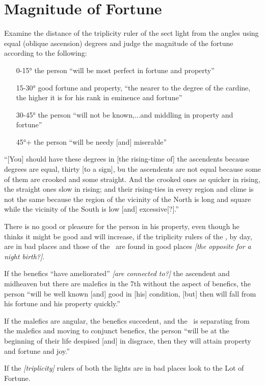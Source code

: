 \section{Magnitude of Fortune}

Examine the distance of the triplicity ruler of the sect light from the angles using equal (oblique ascension) degrees and judge the magnitude of the fortune according to the following:
\begin{itemize}[topsep=0em,itemsep=0em]
\item[0-15°] the person ``will be most perfect in fortune and property''
\item[15-30°] good fortune and property, ``the nearer to the degree of the cardine, the higher it is for his rank in eminence and fortune''
\item[30-45°] the person ``will not be known,...and middling in property and fortune''
\item[45°+]  the person ``will be needy [and] miserable''
\end{itemize}

``[You] should have these degrees in [the rising-time of] the ascendents because degrees are equal, thirty [to a sign], bu the ascendents are not equal because some of them are crooked and some straight. And the crooked ones ae quicker in rising, the straight ones slow in rising; and their rising-ties in every region and clime is not the same because the region of the vicinity of the North is long and square while the vicinity of the South is low [and] excessive[?].''

There is no good or pleasure for the person in his property, even though he thinks it might be good and will increase, if the triplicity rulers of the \Sun, by day, are in bad places and those of the \Moon\, are found in good places \textsl{[the opposite for a night birth?]}.

If the benefics ``have ameliorated'' \textsl{[are connected to?]} the ascendent and midheaven but there are malefics in the 7th without the aspect of benefics, the person ``will be well known [and] good in [his] condition, [but] then will fall from his fortune and his property quickly.''

If the malefics are angular, the benefics succedent, and the \Moon\, is separating from the malefics and moving to conjunct  benefics, the person ``will be at the beginning of their life despised [and] in disgrace, then they will attain property and fortune and joy.''

If the \textsl{[triplicity]} rulers of both the lights are in bad places look to the Lot of Fortune.

